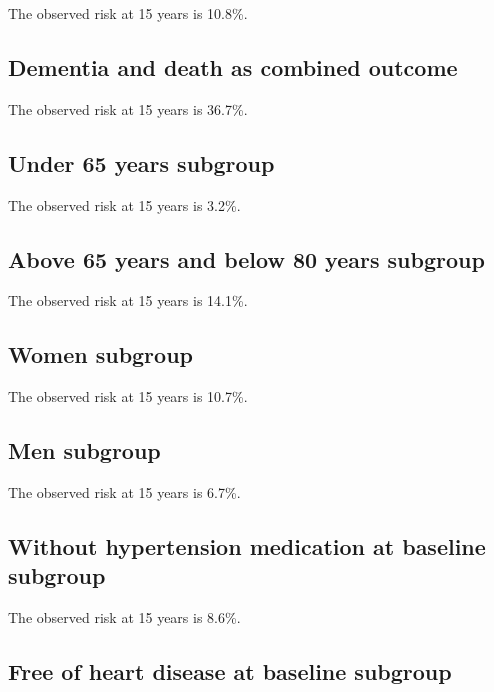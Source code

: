\documentclass[
]{book}
\begin{document}
The observed risk at 15 years is 10.8\%.

\hypertarget{dementia-and-death-as-combined-outcome}{%
\subsection{Dementia and death as combined outcome}\label{dementia-and-death-as-combined-outcome}}

The observed risk at 15 years is 36.7\%.

\hypertarget{under-65-years-subgroup-1}{%
\subsection{Under 65 years subgroup}\label{under-65-years-subgroup-1}}

The observed risk at 15 years is 3.2\%.

\hypertarget{above-65-years-and-below-80-years-subgroup-1}{%
\subsection{Above 65 years and below 80 years subgroup}\label{above-65-years-and-below-80-years-subgroup-1}}

The observed risk at 15 years is 14.1\%.

\hypertarget{women-subgroup-1}{%
\subsection{Women subgroup}\label{women-subgroup-1}}

The observed risk at 15 years is 10.7\%.

\hypertarget{men-subgroup-1}{%
\subsection{Men subgroup}\label{men-subgroup-1}}

The observed risk at 15 years is 6.7\%.

\hypertarget{without-hypertension-medication-at-baseline-subgroup-1}{%
\subsection{Without hypertension medication at baseline subgroup}\label{without-hypertension-medication-at-baseline-subgroup-1}}

The observed risk at 15 years is 8.6\%.

\hypertarget{free-of-heart-disease-at-baseline-subgroup}{%
\subsection{Free of heart disease at baseline subgroup}\label{free-of-heart-disease-at-baseline-subgroup}}
\end{document}
